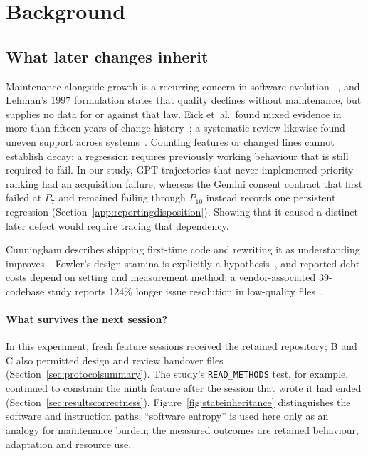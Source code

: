 \section{Background}\label{sec:background}

\subsection{What later changes inherit}\label{sec:decay}

Maintenance alongside growth is a recurring concern in software evolution
~\cite{lehman1980laws,lehman1997metrics,parnas1994aging}, and Lehman's 1997
formulation states that quality declines without maintenance, but supplies
no data for or against that law. Eick et~al.\ found mixed evidence in more
than fifteen years of change history~\cite{eick2001decay}; a systematic
review likewise found uneven support across systems~\cite{herraiz2013laws}.
Counting features or changed lines cannot establish decay: a regression
requires previously working behaviour that is still required to fail.
In our study, GPT trajectories that never implemented priority ranking
had an acquisition failure, whereas the Gemini consent contract that first failed
at $P_7$ and remained failing through $P_{10}$ instead records one
persistent regression (Section~\ref{app:reportingdisposition}).
Showing that it caused a distinct later defect would require tracing
that dependency.

Cunningham describes shipping first-time code and rewriting it as
understanding improves~\cite{cunningham1992wycash}. Fowler's design
stamina is explicitly a hypothesis~\cite{fowler2007stamina}, and reported debt costs depend on setting and measurement method: a
vendor-associated 39-codebase study reports 124\% longer issue resolution in
low-quality files~\cite{tornhill2022codered}.

\paragraph{What survives the next session?}\label{sec:inheritance}
In this experiment, fresh feature sessions received the retained repository;
B and C also permitted design and review handover files
(Section~\ref{sec:protocolsummary}). The study's
\texttt{READ\_METHODS} test, for example, continued to constrain the
ninth feature after the session that wrote it had ended
(Section~\ref{sec:resultscorrectness}).
Figure~\ref{fig:stateinheritance} distinguishes the software and instruction
paths; ``software entropy'' is used here only
as an analogy for maintenance burden; the measured outcomes are retained
behaviour, adaptation and resource use.

